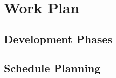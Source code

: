 \chapter{Work Plan} \label{chap:workplan}

\section*{}

\section{Development Phases}\label{sec:devphases}

\section{Schedule Planning}\label{sec:schedule}
